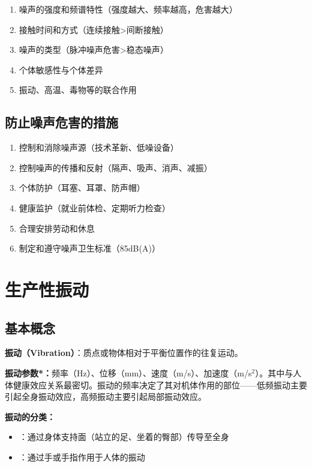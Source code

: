 \begin{enumerate}[leftmargin=*]
    \item 噪声的强度和频谱特性（强度越大、频率越高，危害越大）
    \item 接触时间和方式（连续接触>间断接触）
    \item 噪声的类型（脉冲噪声危害>稳态噪声）
    \item 个体敏感性与个体差异
    \item 振动、高温、毒物等的联合作用
\end{enumerate}

\subsection{防止噪声危害的措施}

\begin{enumerate}[leftmargin=*]
    \item 控制和消除噪声源（技术革新、低噪设备）
    \item 控制噪声的传播和反射（隔声、吸声、消声、减振）
    \item 个体防护（耳塞、耳罩、防声帽）
    \item 健康监护（就业前体检、定期听力检查）
    \item 合理安排劳动和休息
    \item 制定和遵守噪声卫生标准（85dB(A)）
\end{enumerate}

\section{生产性振动}

\subsection{基本概念}

\begin{defbox}
\textbf{振动（Vibration）}：质点或物体相对于平衡位置作的往复运动。

\textbf{振动参数*：}频率（Hz）、位移（mm）、速度（m/s）、加速度（m/s$^2$）。其中与人体健康效应关系最密切。振动的频率决定了其对机体作用的部位——低频振动主要引起全身振动效应，高频振动主要引起局部振动效应。

\textbf{振动的分类：}
\begin{itemize}[leftmargin=*]
    \item {}：通过身体支持面（站立的足、坐着的臀部）传导至全身
    \item {}：通过手或手指作用于人体的振动
\end{itemize}
\end{defbox}

